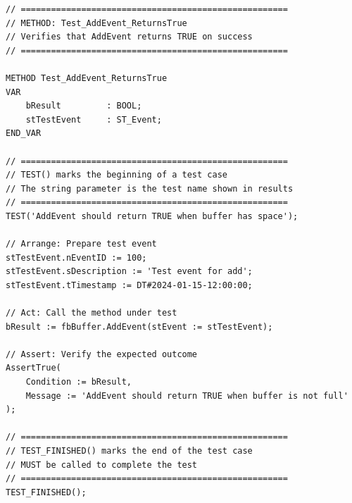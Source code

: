 \documentclass[11pt,a4paper]{article}
\begin{document}
\begin{lstlisting}
// =====================================================
// METHOD: Test_AddEvent_ReturnsTrue
// Verifies that AddEvent returns TRUE on success
// =====================================================

METHOD Test_AddEvent_ReturnsTrue
VAR
    bResult         : BOOL;
    stTestEvent     : ST_Event;
END_VAR

// =====================================================
// TEST() marks the beginning of a test case
// The string parameter is the test name shown in results
// =====================================================
TEST('AddEvent should return TRUE when buffer has space');

// Arrange: Prepare test event
stTestEvent.nEventID := 100;
stTestEvent.sDescription := 'Test event for add';
stTestEvent.tTimestamp := DT#2024-01-15-12:00:00;

// Act: Call the method under test
bResult := fbBuffer.AddEvent(stEvent := stTestEvent);

// Assert: Verify the expected outcome
AssertTrue(
    Condition := bResult,
    Message := 'AddEvent should return TRUE when buffer is not full'
);

// =====================================================
// TEST_FINISHED() marks the end of the test case
// MUST be called to complete the test
// =====================================================
TEST_FINISHED();
\end{lstlisting}
\end{document}
